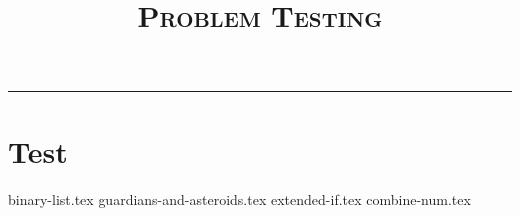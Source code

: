 \documentclass{exam}
\title{\textsc{Problem Testing}}
\begin{document}
\maketitle
\rule{\textwidth}{0.15em}
\fontsize{12}{15}\selectfont

\section{Test}
\begin{questions}
{binary-list.tex}
{guardians-and-asteroids.tex}
{extended-if.tex}
{combine-num.tex}
\end{questions}
\end{document}
